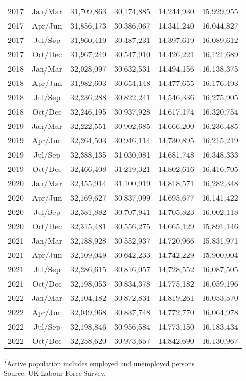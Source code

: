 \documentclass[
]{book}
\begin{document}
\begin{longtable}{ccrrrr}
2017 & Jan/Mar & 31,709,863 & 30,174,885 & 14,244,930 & 15,929,955 \\ 
2017 & Apr/Jun & 31,856,173 & 30,386,067 & 14,341,240 & 16,044,827 \\ 
2017 & Jul/Sep & 31,960,419 & 30,487,231 & 14,397,619 & 16,089,612 \\ 
2017 & Oct/Dec & 31,967,249 & 30,547,910 & 14,426,221 & 16,121,689 \\ 
2018 & Jan/Mar & 32,028,097 & 30,632,531 & 14,494,156 & 16,138,375 \\ 
2018 & Apr/Jun & 31,982,603 & 30,654,148 & 14,477,655 & 16,176,493 \\ 
2018 & Jul/Sep & 32,236,288 & 30,822,241 & 14,546,336 & 16,275,905 \\ 
2018 & Oct/Dec & 32,246,195 & 30,937,928 & 14,617,174 & 16,320,754 \\ 
2019 & Jan/Mar & 32,222,551 & 30,902,685 & 14,666,200 & 16,236,485 \\ 
2019 & Apr/Jun & 32,264,503 & 30,946,114 & 14,730,895 & 16,215,219 \\ 
2019 & Jul/Sep & 32,388,135 & 31,030,081 & 14,681,748 & 16,348,333 \\ 
2019 & Oct/Dec & 32,466,408 & 31,219,321 & 14,802,616 & 16,416,705 \\ 
2020 & Jan/Mar & 32,455,914 & 31,100,919 & 14,818,571 & 16,282,348 \\ 
2020 & Apr/Jun & 32,169,627 & 30,837,099 & 14,695,677 & 16,141,422 \\ 
2020 & Jul/Sep & 32,381,882 & 30,707,941 & 14,705,823 & 16,002,118 \\ 
2020 & Oct/Dec & 32,315,481 & 30,556,275 & 14,665,129 & 15,891,146 \\ 
2021 & Jan/Mar & 32,188,928 & 30,552,937 & 14,720,966 & 15,831,971 \\ 
2021 & Apr/Jun & 32,109,049 & 30,642,233 & 14,742,229 & 15,900,004 \\ 
2021 & Jul/Sep & 32,286,615 & 30,816,057 & 14,728,552 & 16,087,505 \\ 
2021 & Oct/Dec & 32,198,053 & 30,834,378 & 14,775,182 & 16,059,196 \\ 
2022 & Jan/Mar & 32,104,182 & 30,872,831 & 14,819,261 & 16,053,570 \\ 
2022 & Apr/Jun & 32,049,968 & 30,837,748 & 14,772,770 & 16,064,978 \\ 
2022 & Jul/Sep & 32,198,846 & 30,956,584 & 14,773,150 & 16,183,434 \\ 
2022 & Oct/Dec & 32,258,620 & 30,973,657 & 14,842,690 & 16,130,967 \\ 
\bottomrule
\end{longtable}
\begin{minipage}{\linewidth}
\textsuperscript{\textit{1}}Active population includes employed and unemployed persons\\
Source: UK Labour Force Survey.\\
\end{minipage}
\end{document}
